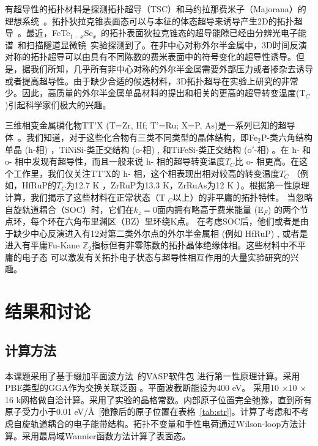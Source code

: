     
有超导性的拓扑材料是探测拓扑超导（TSC）和马约拉那费米子（Majorana）的理想系统~\citep{yan2013large,wu2015,Schoop2015,chang2016,wang2016spontaneous,xie2017,nie2018}。拓扑狄拉克锥表面态可以与本征的体态超导来诱导产生2D的拓扑超导~\citep{Fu2008superconducting,Fu2010odd,alicea2012new,sato2017topological}。最近，FeTe$_{1-x}$Se$_x$~\citep{wang2015,xu2016}的拓扑表面狄拉克锥态的超导能隙已经由分辨光电子能谱~\citep{Zhang182}和扫描隧道显微镜~\citep{Wang333}实验探测到了。在非中心对称外尔半金属中，3D时间反演对称的拓扑超导可以由具有不同陈数的费米表面中的符号变化的超导性诱导\citep{qi2010,Hosur204}。但是，据我们所知，几乎所有非中心对称的外尔半金属需要外部压力或者掺杂去诱导或者提高超导性\citep{pan2015pressure,kang2015superconductivity,qi2016superconductivity,chen2016superconductivity,li2017concurrence,xu2019topological}。由于缺少合适的候选材料，3D拓扑超导在实验上研究的非常少。因此，高质量的外尔半金属单晶材料的提出和相关的更高的超导转变温度(T$_C$)引起科学家们极大的兴趣。   
    
    
三维相变金属磷化物TT'X (T=Zr, Hf; T'=Ru; X=P, As)是一系列已知的超导体~\citep{barz1980ternary,meisner1983superconductivity}。我们知道，对于这些化合物有三类不同类型的晶体结构\citep{MULLER1983177,meisner1983superconductivity}，即Fe$_2$P-类六角结构单晶 (h-相) ，TiNiSi-类正交结构 (o-相) , 和TiFeSi-类正交结构 (o$'$-相) 。在 h- 和 o- 相中发现有超导性，而且一般来说 h- 相的超导转变温度$T_C$比 o- 相更高。在这个工作里，我们仅关注TT'X的 h- 相，这个相表现出相对较高的转变温度$T_C$ （例如，HfRuP的$T_C$为12.7 K \citep{barz1980ternary}，ZrRuP为13.3 K，ZrRuAs为12 K \citep{meisner1983superconductivity}）。根据第一性原理计算，我们揭示了这些材料在正常状态（T $ _C $以上）的非平庸的拓扑特性。
当忽略自旋轨道耦合（SOC）时，它们在$k_z=0$面内拥有略高于费米能量 (E$_F$) 的两个节点环，每个环在六角布里渊区（BZ）里环绕K点。 在考虑SOC后，他们或者是由于缺少中心反演进入有12对第二类外尔点的外尔半金属相 (例如 HfRuP) , 或者是进入有平庸Fu-Kane $\mathbb Z_2$指标\citep{Fu2007topo}但有非零陈数的拓扑晶体绝缘体相。这些材料中不平庸的电子态
可以激发有关拓扑电子状态与超导性相互作用的大量实验研究的兴趣。
    
    
\section{结果和讨论}
\subsection{计算方法}
本课题采用了基于缀加平面波方法~\citep{paw1,paw2}的VASP软件包 \citep{KRESSE199615,vasp}进行第一性原理计算。采用PBE类型的GGA作为交换关联泛函 \citep{pbe}。平面波截断能设为400 eV。 采用10 $\times$10 $\times$ 16 k网格做自洽计算。采用了实验的晶格常数\citep{Meisner1983,MEISNER1983983}。内部原子位置完全弛豫，直到所有原子受力小于0.01 eV/\AA~[弛豫后的原子位置在表格~\ref{tab:str}]。计算了考虑和不考虑自旋轨道耦合的电子能带结构。拓扑不变量和手性电荷通过Wilson-loop方法计算。采用最局域Wannier函数方法计算了表面态\citep{mlwf}。


